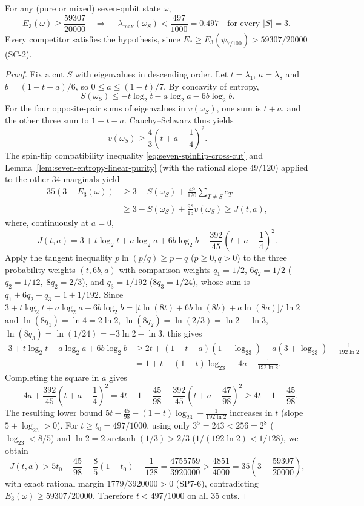 \begin{corollary}
\label{cor:seven-entropy-eigen-cap-497}
For any (pure or mixed) seven-qubit state \(\omega\),
\[
 E_3(\omega)\ge\frac{59307}{20000}
 \quad\Longrightarrow\quad
 \boxed{\ \lambda_{\max}(\omega_S)
      <\frac{497}{1000}=0.497
      \quad\text{for every }|S|=3.\ }
\]
Every competitor satisfies the hypothesis, since
\(E_*\ge E_3(\psi_{7/100})>59307/20000\) (SC-2).
\end{corollary}
\begin{proof}
Fix a cut \(S\) with eigenvalues in descending
order. Let \(t=\lambda_1\), \(a=\lambda_8\)
and \(b=(1-t-a)/6\), so \(0\le a\le(1-t)/7\).
By concavity of entropy,
\[
 S(\omega_S)\le
 -t\log_2t-a\log_2a-6b\log_2b.
\]
For the four opposite-pair sums of eigenvalues
in \(v(\omega_S)\), one sum is \(t+a\), and
the other three sum to \(1-t-a\).
Cauchy--Schwarz thus yields
\[
 v(\omega_S)\ge\frac43
      \left(t+a-\frac14\right)^2.
\]
The spin-flip compatibility inequality
\eqref{eq:seven-spinflip-cross-cut} and
Lemma~\ref{lem:seven-entropy-linear-purity}
(with the rational slope \(49/120\))
applied to the other 34 marginals yield
\[
\begin{split}
 35(3-E_3(\omega))
 &\ge 3-S(\omega_S)
      +\frac{49}{120}\sum_{T\ne S}e_T\\
 &\ge 3-S(\omega_S)+\frac{98}{15}v(\omega_S)
 \ge J(t,a),
\end{split}
\]
where, continuously at \(a=0\),
\[
 J(t,a)=3+t\log_2t+a\log_2a+6b\log_2b
      +\frac{392}{45}
           \left(t+a-\frac14\right)^2.
\]
Apply the tangent inequality \(p\ln(p/q)\ge p-q\)
(\(p\ge0,q>0\)) to the three probability weights
\((t,6b,a)\) with comparison weights
\(q_1=1/2\), \(6q_2=1/2\) (\(q_2=1/12,\;8q_2=2/3\)), and
\(q_3=1/192\) (\(8q_3=1/24\)), whose sum is
\(q_1+6q_2+q_3=1+1/192\). Since
\(3+t\log_2t+a\log_2a+6b\log_2b
 =\bigl[t\ln(8t)+6b\ln(8b)+a\ln(8a)\bigr]/\ln2\)
and \(\ln(8q_1)=\ln4=2\ln2\),
\(\ln(8q_2)=\ln(2/3)=\ln2-\ln3\),
\(\ln(8q_3)=\ln(1/24)=-3\ln2-\ln3\), this gives
\[
\begin{aligned}
 3+t\log_2t+a\log_2a+6b\log_2b
 &\ge 2t+(1-t-a)(1-\log_23)-a(3+\log_23)
      -\frac1{192\ln2}\\
 &=1+t-(1-t)\log_23-4a-\frac1{192\ln2}.
\end{aligned}
\]
Completing the square in \(a\) gives
\[
 -4a+\frac{392}{45}\left(t+a-\frac14\right)^2
 =4t-1-\frac{45}{98}
  +\frac{392}{45}\left(t+a-\frac{47}{98}\right)^2
 \ge 4t-1-\frac{45}{98}.
\]
The resulting lower bound \(5t-\frac{45}{98}-(1-t)\log_23-\frac1{192\ln2}\) increases in \(t\)
(slope \(5+\log_23>0\)). For \(t\ge t_0=497/1000\), using only
\(3^5=243<256=2^8\) (\(\log_23<8/5\)) and
\(\ln2=2\operatorname{arctanh}(1/3)>2/3\)
(\(1/(192\ln2)<1/128\)), we obtain
\[
 J(t,a)
 >5t_0-\frac{45}{98}-\frac85(1-t_0)-\frac1{128}
 =\frac{4755759}{3920000}
 >\frac{4851}{4000}
 =35\left(3-\frac{59307}{20000}\right),
\]
with exact rational margin \(1779/3920000>0\) (SP7-6),
contradicting \(E_3(\omega)\ge59307/20000\).
Therefore \(t<497/1000\) on all 35 cuts.
\end{proof}

